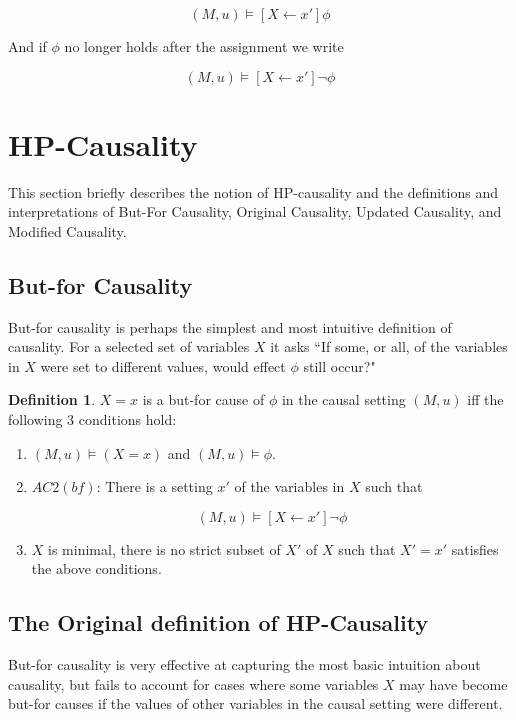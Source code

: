 \documentclass{article}
\theoremstyle{plain}
\theoremstyle{definition}
\newtheorem{defn}[thm]{Definition} %
\begin{document}
\[
(M,u)\models [X\leftarrow x']\phi
\]

And if $\phi$ no longer holds after the assignment we write

\[
(M,u)\models [X\leftarrow x']\lnot \phi
\]

\section{HP-Causality} \label{sec:hpCausality}
This section briefly describes the notion of HP-causality and the definitions and interpretations of But-For Causality, Original Causality, Updated Causality, and Modified Causality.

\subsection{But-for Causality} \label{sec:butForPlanning}

But-for causality is perhaps the simplest and most intuitive definition of causality. For a selected set of variables $X$ it asks ``If some, or all, of the variables in $X$ were set to different values, would effect $\phi$ still occur?"

\begin{defn}$X=x$ is a but-for cause of $\phi$ in the causal setting $(M,u)$ iff the following 3 conditions hold:
\begin{enumerate}
\item $(M,u) \models (X=x)$ and $(M,u) \models \phi$.
\item $AC2(bf)$: There is a setting $x'$ of the variables in $X$ such that

\[
(M,u) \models [X\leftarrow x']\lnot \phi
\] 

\item $X$ is minimal, there is no strict subset of $X'$ of $X$ such that $X' = x'$ satisfies the above conditions.
\end{enumerate}

\end{defn}






\subsection{The Original definition of HP-Causality} \label{sec:orginal}

But-for causality is very effective at capturing the most basic intuition about causality, but fails to account for cases where some variables $X$ may have become but-for causes if the values of other variables in the causal setting were different.
\end{document}
